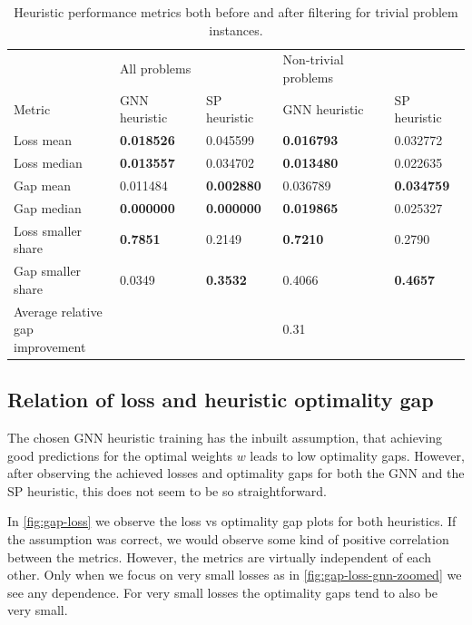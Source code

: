 \documentclass[english, 12pt, a4paper, sci, utf8, a-2b, online]{aaltothesis}
\begin{document}
\begin{table}[h]
    \centering
    \caption{Heuristic performance metrics both before and after filtering for trivial problem instances.}
    \label{tab:results}
    \footnotesize
    \begin{tabular}{l|ll|ll}
                                     & All problems  &                   & Non-trivial problems &                   \\
    Metric                           & GNN heuristic & SP heuristic & GNN heuristic        & SP heuristic \\ \hline
    Loss mean                        & \textbf{0.018526} & 0.045599          & \textbf{0.016793}    & 0.032772          \\
    Loss median                      & \textbf{0.013557} & 0.034702          & \textbf{0.013480}    & 0.022635          \\
    Gap mean                         & 0.011484          & \textbf{0.002880} & 0.036789             & \textbf{0.034759} \\
    Gap median                       & \textbf{0.000000} & \textbf{0.000000} & \textbf{0.019865}    & 0.025327          \\
    Loss smaller share               & \textbf{0.7851}   & 0.2149            & \textbf{0.7210}      & 0.2790            \\
    Gap smaller share                & 0.0349            & \textbf{0.3532}   & 0.4066               & \textbf{0.4657}   \\
    \makecell{Average relative\\gap improvement} &               &                   & 0.31                 &                  
    \end{tabular}
    \end{table}


\subsection{Relation of loss and heuristic optimality gap}
\label{sec:loss-gap-relation}

The chosen GNN heuristic training has the inbuilt assumption, that achieving good predictions for the optimal weights $w$ leads to low optimality gaps. However, after observing the achieved losses and optimality gaps for both the GNN and the SP heuristic, this does not seem to be so straightforward.

In \cref{fig:gap-loss} we observe the loss vs optimality gap plots for both heuristics. If the assumption was correct, we would observe some kind of positive correlation between the metrics. However, the metrics are virtually independent of each other. Only when we focus on very small losses as in \cref{fig:gap-loss-gnn-zoomed} we see any dependence. For very small losses the optimality gaps tend to also be very small.
\end{document}
